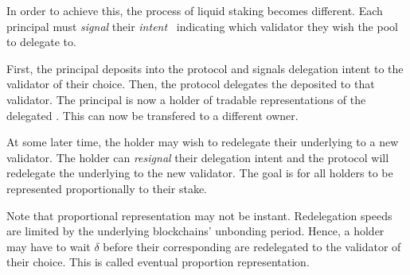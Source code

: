 In order to achieve this, the process of liquid
staking becomes different. Each principal must \emph{signal} their
\emph{intent}~\cite{quicksilver} indicating which validator they wish
the pool to delegate to.

First, the principal deposits \asset into the protocol and signals
delegation intent to the validator of their choice. Then, the protocol
delegates the deposited \asset to that validator. The principal is
now a holder of tradable \stasset representations of the delegated \asset.
This \stasset can now be transfered to a different owner.

At some later time, the \stasset holder may wish to redelegate
their underlying \asset to a new validator.
The \stasset holder can \emph{resignal} their delegation intent and the protocol
will redelegate the underlying \asset to the new validator.
The goal is for all \stasset holders to be represented proportionally to
their stake.

Note that proportional representation may not be instant. Redelegation speeds
are limited by the underlying blockchains' unbonding period.
Hence, a \stasset holder may have to wait $\delta$ before their corresponding
\assets are redelegated to the validator of their choice. This is called
eventual proportion representation.
